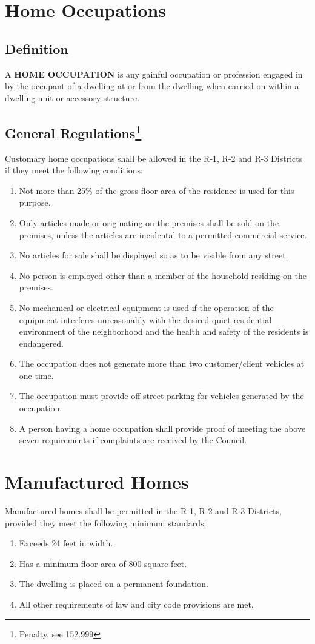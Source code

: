 \section{Home Occupations}
\subsection{Definition} A \textbf{HOME OCCUPATION} is any gainful occupation or profession engaged in by the occupant of a dwelling at or from the dwelling when carried on within a dwelling unit or accessory structure.
\subsection{General Regulations\footnote{Penalty, see 152.999}}
Customary home occupations shall be allowed in the R-1, R-2 and R-3 Districts if they meet the following conditions:
\begin{enumerate}[{\indent}1)]
    \item Not more than 25\% of the gross floor area of the residence is used for this purpose.
    \item Only articles made or originating on the premises shall be sold on the premises, unless the articles are incidental to a permitted commercial service.
    \item No articles for sale shall be displayed so as to be visible from any street.
    \item No person is employed other than a member of the household residing on the premises.
    \item No mechanical or electrical equipment is used if the operation of the equipment interferes unreasonably with the desired quiet residential environment of the neighborhood and the health and safety of the residents is endangered.
    \item The occupation does not generate more than two customer/client vehicles at one time.
    \item The occupation must provide off-street parking for vehicles generated by the occupation.
    \item A person having a home occupation shall provide proof of meeting the above seven requirements if complaints are received by the Council.
\end{enumerate}

\section{Manufactured Homes}
Manufactured homes shall be permitted in the R-1, R-2 and R-3 Districts, provided they meet the following minimum standards:
\begin{enumerate}[{\indent}A)]
    \item Exceeds 24 feet in width.
    \item Has a minimum floor area of 800 square feet.
    \item The dwelling is placed on a permanent foundation.
    \item All other requirements of law and city code provisions are met.
\end{enumerate}

